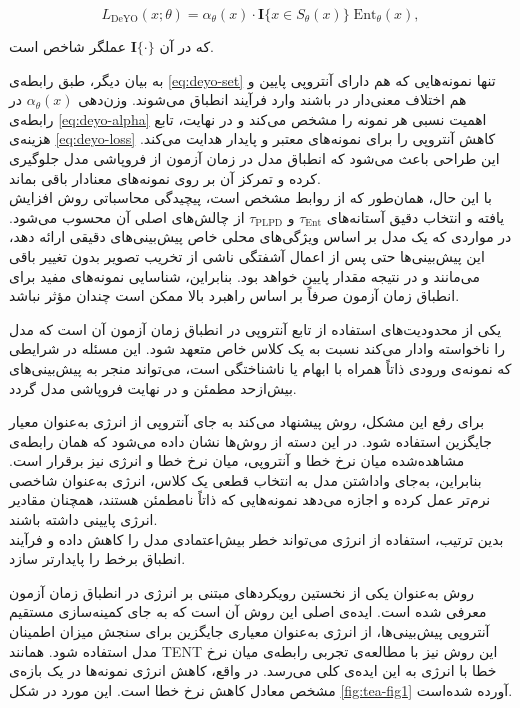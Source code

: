 \begin{equation}
	L_{\mathrm{DeYO}}(x; \theta) = \alpha_{\theta}(x) \cdot \mathbf{I}\{x \in S_{\theta}(x)\} \; \mathrm{Ent}_{\theta}(x),
	\label{eq:deyo-loss}
\end{equation}

که در آن \(\mathbf{I}\{\cdot\}\) عملگر شاخص است.  

به بیان دیگر، طبق رابطه‌ی \ref{eq:deyo-set} تنها نمونه‌هایی که هم دارای آنتروپی پایین و هم اختلاف معنی‌دار در  باشند وارد فرآیند انطباق می‌شوند. 
وزن‌دهی \(\alpha_{\theta}(x)\) در رابطه‌ی \ref{eq:deyo-alpha} اهمیت نسبی هر نمونه را مشخص می‌کند و در نهایت، 
تابع هزینه‌ی \ref{eq:deyo-loss} کاهش آنتروپی را برای نمونه‌های معتبر و پایدار هدایت می‌کند. 
این طراحی باعث می‌شود که انطباق مدل در زمان آزمون از فروپاشی مدل جلوگیری کرده و تمرکز آن بر روی نمونه‌های معنادار باقی بماند.\\
با این حال، همان‌طور که از روابط مشخص است، پیچیدگی محاسباتی روش افزایش یافته و انتخاب دقیق آستانه‌های \(\tau_{\text{Ent}}\) و \(\tau_{\text{PLPD}}\) 
از چالش‌های اصلی آن محسوب می‌شود.
در مواردی که یک مدل بر اساس ویژگی‌های محلی خاص پیش‌بینی‌های دقیقی ارائه دهد، این پیش‌بینی‌ها حتی پس از اعمال آشفتگی ناشی از تخریب تصویر بدون تغییر باقی می‌مانند و در نتیجه مقدار  پایین خواهد بود. بنابراین، شناسایی نمونه‌های مفید برای انطباق زمان آزمون صرفاً بر اساس راهبرد  بالا ممکن است چندان مؤثر نباشد. 


یکی از محدودیت‌های استفاده از تابع آنتروپی در انطباق زمان آزمون آن است که مدل را ناخواسته وادار می‌کند نسبت به یک کلاس خاص متعهد شود. این مسئله در شرایطی که نمونه‌ی ورودی ذاتاً همراه با ابهام یا ناشناختگی است، می‌تواند منجر به پیش‌بینی‌های بیش‌ازحد مطمئن و در نهایت فروپاشی مدل گردد.  

برای رفع این مشکل، روش \cite{tea} پیشنهاد می‌کند به جای آنتروپی از انرژی به‌عنوان معیار جایگزین استفاده شود. در این دسته از روش‌ها نشان داده می‌شود که همان رابطه‌ی مشاهده‌شده میان نرخ خطا و آنتروپی، میان نرخ خطا و انرژی نیز برقرار است. بنابراین، به‌جای واداشتن مدل به انتخاب قطعی یک کلاس، انرژی به‌عنوان شاخصی نرم‌تر عمل کرده و اجازه می‌دهد نمونه‌هایی که ذاتاً نامطمئن هستند، همچنان مقادیر انرژی پایینی داشته باشند.\\
بدین ترتیب، استفاده از انرژی می‌تواند خطر {بیش‌اعتمادی مدل} را کاهش داده و فرآیند انطباق برخط را پایدارتر سازد. 


روش  به‌عنوان یکی از نخستین رویکردهای مبتنی بر انرژی در انطباق زمان آزمون معرفی شده است. 
ایده‌ی اصلی این روش آن است که به جای کمینه‌سازی مستقیم آنتروپی پیش‌بینی‌ها، 
از انرژی به‌عنوان معیاری جایگزین برای سنجش میزان اطمینان مدل استفاده شود.
همانند TENT این روش نیز با مطالعه‌ی تجربی رابطه‌ی میان نرخ خطا با انرژی به این ایده‌‌‌ی کلی می‌رسد.
در واقع، کاهش انرژی نمونه‌ها در یک بازه‌ی مشخص معادل کاهش نرخ خطا است. این مورد در شکل \ref{fig:tea-fig1} آورده شده‌است.

